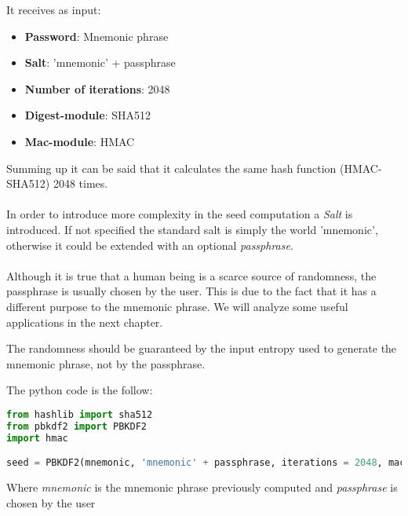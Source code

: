 It receives as input:
\begin{itemize}[label=$\odot$]
	\item \textbf{Password}: Mnemonic phrase
	\item \textbf{Salt}: 'mnemonic' + passphrase
	\item \textbf{Number of iterations}: 2048
	\item \textbf{Digest-module}: SHA512
	\item \textbf{Mac-module}: HMAC
\end{itemize}
Summing up it can be said that it calculates the same hash function (HMAC-SHA512) 2048 times.
\\ \\
In order to introduce more complexity in the seed computation a \textit{Salt} is introduced. If not specified the standard salt is simply the world 'mnemonic', otherwise it could be extended with an optional \textit{passphrase}.
\\ \\
Although it is true that a human being is a scarce source of randomness, the passphrase is usually chosen by the user. This is due to the fact that it has a different purpose to the mnemonic phrase. We will analyze some useful applications in the next chapter. 
\begin{remark}
	The randomness should be guaranteed by the input entropy used to generate the mnemonic phrase, not by the passphrase.
\end{remark}
The python code is the follow:
\begin{lstlisting}[language=Python]
from hashlib import sha512
from pbkdf2 import PBKDF2
import hmac

seed = PBKDF2(mnemonic, 'mnemonic' + passphrase, iterations = 2048, macmodule = hmac, digestmodule = sha512).read(64)
\end{lstlisting}
Where \textit{mnemonic} is the mnemonic phrase previously computed and \textit{passphrase} is chosen by the user

